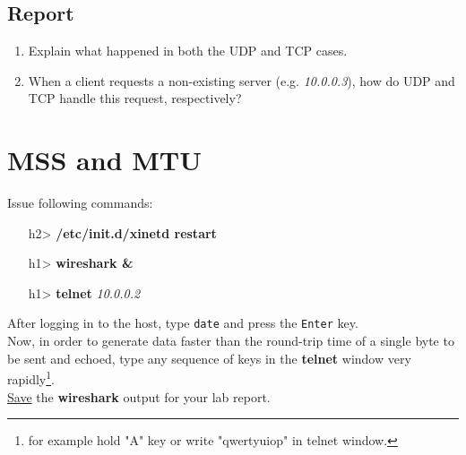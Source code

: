 \documentclass[10pt,a4paper]{article}
\numberwithin{equation}{section}
\numberwithin{figure}{section}
\numberwithin{table}{section}
\begin{document}
    \subsection*{Report}
    \begin{enumerate}
        \item Explain what happened in both the UDP and TCP cases.
        \item When a client requests a non-existing server (e.g. \textit{10.0.0.3}), how do UDP and TCP handle this request, respectively?

    \end{enumerate}
    
\section*{MSS and MTU}
    Issue following commands:
    \begin{itemize}
    	\item [h2>] \textbf{/etc/init.d/xinetd restart}
        \item [h1>] \textbf{wireshark \&}
        \item [h1>] \textbf{telnet} \textit{10.0.0.2}
    \end{itemize}
    After logging in to the host, type \texttt{date} and press the \texttt{Enter} key. \\
    Now, in order to generate data faster than the round-trip time of a single byte to be sent and echoed, type any sequence of keys in the \textbf{telnet} window very rapidly\footnote{for example hold "A" key or write "qwertyuiop" in telnet window.}. \\
    \underline{Save} the \textbf{wireshark} output for your lab report.
\end{document}

